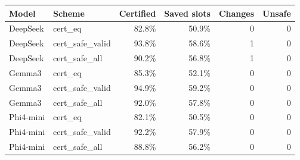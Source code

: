 \begin{tabular}{llrrrr}
\toprule
Model & Scheme & Certified & Saved slots & Changes & Unsafe \\
\midrule
DeepSeek & cert\_eq & 82.8\% & 50.9\% & 0 & 0 \\
DeepSeek & cert\_safe\_valid & 93.8\% & 58.6\% & 1 & 0 \\
DeepSeek & cert\_safe\_all & 90.2\% & 56.8\% & 1 & 0 \\
Gemma3 & cert\_eq & 85.3\% & 52.1\% & 0 & 0 \\
Gemma3 & cert\_safe\_valid & 94.9\% & 59.2\% & 0 & 0 \\
Gemma3 & cert\_safe\_all & 92.0\% & 57.8\% & 0 & 0 \\
Phi4-mini & cert\_eq & 82.1\% & 50.5\% & 0 & 0 \\
Phi4-mini & cert\_safe\_valid & 92.2\% & 57.9\% & 0 & 0 \\
Phi4-mini & cert\_safe\_all & 88.8\% & 56.2\% & 0 & 0 \\
\bottomrule
\end{tabular}
